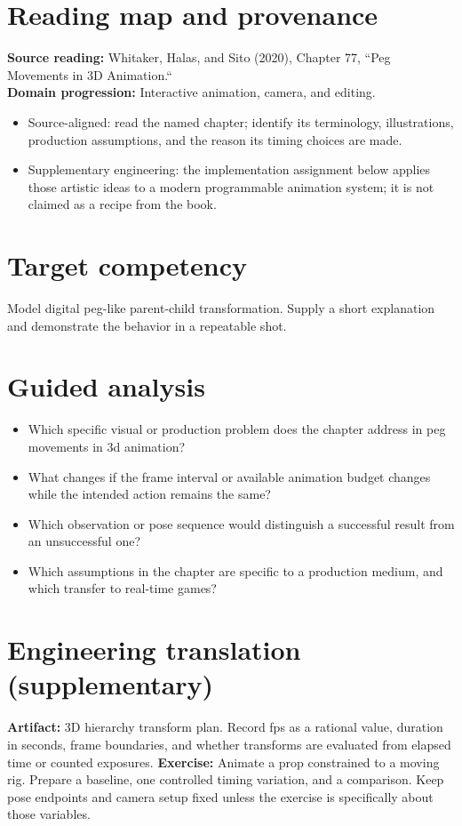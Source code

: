 \documentclass[10pt,letterpaper]{article}
\begin{document}
\makedoctitle
\makedocsummary

\section{Reading map and provenance}
\textbf{Source reading:} Whitaker, Halas, and Sito (2020), Chapter 77, ``Peg Movements in 3D Animation.``\\
\textbf{Domain progression:} Interactive animation, camera, and editing.
\begin{itemize}
\item Source-aligned: read the named chapter; identify its terminology, illustrations, production assumptions, and the reason its timing choices are made.
\item Supplementary engineering: the implementation assignment below applies those artistic ideas to a modern programmable animation system; it is not claimed as a recipe from the book.
\end{itemize}
\section{Target competency}
Model digital peg-like parent-child transformation. Supply a short explanation and demonstrate the behavior in a repeatable shot.
\section{Guided analysis}
\begin{itemize}
\item Which specific visual or production problem does the chapter address in peg movements in 3d animation?
\item What changes if the frame interval or available animation budget changes while the intended action remains the same?
\item Which observation or pose sequence would distinguish a successful result from an unsuccessful one?
\item Which assumptions in the chapter are specific to a production medium, and which transfer to real-time games?
\end{itemize}
\section{Engineering translation (supplementary)}
\textbf{Artifact:} 3D hierarchy transform plan. Record fps as a rational value, duration in seconds, frame boundaries, and whether transforms are evaluated from elapsed time or counted exposures.
\textbf{Exercise:} Animate a prop constrained to a moving rig. Prepare a baseline, one controlled timing variation, and a comparison. Keep pose endpoints and camera setup fixed unless the exercise is specifically about those variables.
\end{document}
